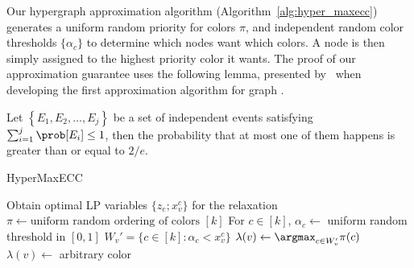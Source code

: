 Our hypergraph \maxecc{} approximation algorithm (Algorithm~\ref{alg:hyper_maxecc}) generates a uniform random priority for colors $\pi$, and independent random color thresholds $\{\alpha_c\}$ to determine which nodes want which colors. A node is then simply assigned to the highest priority color it wants. The proof of our approximation guarantee uses the following lemma, presented by~\citet{angel2016clustering} when developing the first approximation algorithm for graph \maxecc{}.
\begin{lemma}
	\label{lem:angel}
	Let $\left\{E_1, E_2, \dots, E_j \right\}$ be a set of independent events satisfying $\sum_{i=1}^j \prob[E_i] \leq 1$, then the probability that {at most one} of them happens is greater than or equal to $2/e$.
\end{lemma}
\begin{algorithm}[t]
    \caption{\textsf{HyperMaxECC}}
    \label{alg:hyper_maxecc}
    \begin{algorithmic}
        	\STATE Obtain optimal LP variables $\{z_e; x_v^c\}$ for the relaxation
        \STATE $\pi \leftarrow \text{uniform random ordering of colors } [k]$
        \STATE For $c \in [k]$, $\alpha_c \leftarrow $ uniform random threshold in $[0,1]$
        \STATE $W_v' = \{c \in [k] \colon \alpha_c < x_v^c\}$
        \STATE $\lambda(v) \leftarrow \argmax_{c \in W_v'} \pi(c)$
        \ELSE
        \STATE $\lambda(v) \leftarrow $ arbitrary color
        \ENDIF 
        \ENDFOR
    \end{algorithmic}
\end{algorithm}

